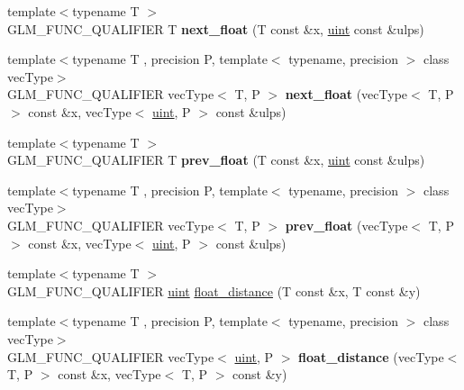 \begin{DoxyCompactItemize}
\item 
{\footnotesize template$<$typename T $>$ }\\G\+L\+M\+\_\+\+F\+U\+N\+C\+\_\+\+Q\+U\+A\+L\+I\+F\+I\+ER T {\bfseries next\+\_\+float} (T const \&x, \hyperlink{group__core__precision_ga4fd29415871152bfb5abd588334147c8}{uint} const \&ulps)\hypertarget{namespaceglm_ae4ffae05b7502be722f522c04f7e42ac}{}\label{namespaceglm_ae4ffae05b7502be722f522c04f7e42ac}

\item 
{\footnotesize template$<$typename T , precision P, template$<$ typename, precision $>$ class vec\+Type$>$ }\\G\+L\+M\+\_\+\+F\+U\+N\+C\+\_\+\+Q\+U\+A\+L\+I\+F\+I\+ER vec\+Type$<$ T, P $>$ {\bfseries next\+\_\+float} (vec\+Type$<$ T, P $>$ const \&x, vec\+Type$<$ \hyperlink{group__core__precision_ga4fd29415871152bfb5abd588334147c8}{uint}, P $>$ const \&ulps)\hypertarget{namespaceglm_a3ad10c60be0fa0e754c8064ca13c4b91}{}\label{namespaceglm_a3ad10c60be0fa0e754c8064ca13c4b91}

\item 
{\footnotesize template$<$typename T $>$ }\\G\+L\+M\+\_\+\+F\+U\+N\+C\+\_\+\+Q\+U\+A\+L\+I\+F\+I\+ER T {\bfseries prev\+\_\+float} (T const \&x, \hyperlink{group__core__precision_ga4fd29415871152bfb5abd588334147c8}{uint} const \&ulps)\hypertarget{namespaceglm_a87ac8f75510274e112fe8512cfaa6935}{}\label{namespaceglm_a87ac8f75510274e112fe8512cfaa6935}

\item 
{\footnotesize template$<$typename T , precision P, template$<$ typename, precision $>$ class vec\+Type$>$ }\\G\+L\+M\+\_\+\+F\+U\+N\+C\+\_\+\+Q\+U\+A\+L\+I\+F\+I\+ER vec\+Type$<$ T, P $>$ {\bfseries prev\+\_\+float} (vec\+Type$<$ T, P $>$ const \&x, vec\+Type$<$ \hyperlink{group__core__precision_ga4fd29415871152bfb5abd588334147c8}{uint}, P $>$ const \&ulps)\hypertarget{namespaceglm_a742d4d85c23906178d1fd0c9fbab266c}{}\label{namespaceglm_a742d4d85c23906178d1fd0c9fbab266c}

\item 
{\footnotesize template$<$typename T $>$ }\\G\+L\+M\+\_\+\+F\+U\+N\+C\+\_\+\+Q\+U\+A\+L\+I\+F\+I\+ER \hyperlink{group__core__precision_ga4fd29415871152bfb5abd588334147c8}{uint} \hyperlink{group__gtc__ulp_ga2e09bd6c8b0a9c91f6f5683d68245634}{float\+\_\+distance} (T const \&x, T const \&y)
\item 
{\footnotesize template$<$typename T , precision P, template$<$ typename, precision $>$ class vec\+Type$>$ }\\G\+L\+M\+\_\+\+F\+U\+N\+C\+\_\+\+Q\+U\+A\+L\+I\+F\+I\+ER vec\+Type$<$ \hyperlink{group__core__precision_ga4fd29415871152bfb5abd588334147c8}{uint}, P $>$ {\bfseries float\+\_\+distance} (vec\+Type$<$ T, P $>$ const \&x, vec\+Type$<$ T, P $>$ const \&y)\hypertarget{namespaceglm_a2e00104097b2f3967e97131933595309}{}\label{namespaceglm_a2e00104097b2f3967e97131933595309}


\end{DoxyCompactItemize}
